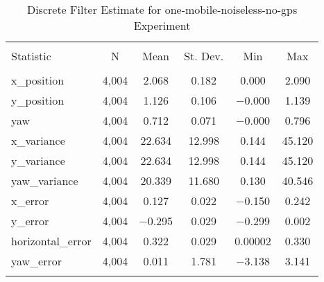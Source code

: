 
\begin{table}[h] \centering 
  \caption{Discrete Filter Estimate for one-mobile-noiseless-no-gps Experiment} 
  \label{tab:one_mobile_noiseless_no_gps_discrete_summary} 
\begin{tabular}{@{\extracolsep{5pt}}lccccc} 
\\[-1.8ex]\hline 
\hline \\[-1.8ex] 
Statistic & \multicolumn{1}{c}{N} & \multicolumn{1}{c}{Mean} & \multicolumn{1}{c}{St. Dev.} & \multicolumn{1}{c}{Min} & \multicolumn{1}{c}{Max} \\ 
\hline \\[-1.8ex] 
x\_position & 4,004 & 2.068 & 0.182 & 0.000 & 2.090 \\ 
y\_position & 4,004 & 1.126 & 0.106 & $-$0.000 & 1.139 \\ 
yaw & 4,004 & 0.712 & 0.071 & $-$0.000 & 0.796 \\ 
x\_variance & 4,004 & 22.634 & 12.998 & 0.144 & 45.120 \\ 
y\_variance & 4,004 & 22.634 & 12.998 & 0.144 & 45.120 \\ 
yaw\_variance & 4,004 & 20.339 & 11.680 & 0.130 & 40.546 \\ 
x\_error & 4,004 & 0.127 & 0.022 & $-$0.150 & 0.242 \\ 
y\_error & 4,004 & $-$0.295 & 0.029 & $-$0.299 & 0.002 \\ 
horizontal\_error & 4,004 & 0.322 & 0.029 & 0.00002 & 0.330 \\ 
yaw\_error & 4,004 & 0.011 & 1.781 & $-$3.138 & 3.141 \\ 
\hline \\[-1.8ex] 
\end{tabular} 
\end{table} 
